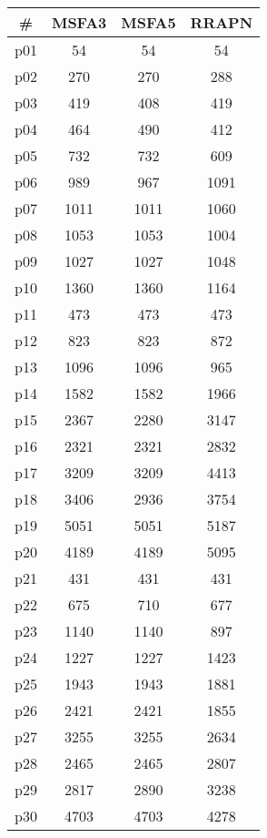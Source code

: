 \begin{tabular}{c||c|c|c}
\textbf{\#} & \textbf{MSFA3} & \textbf{MSFA5} & \textbf{RRAPN}\\
\hline
\hline
p01 & 54 & 54 & 54\\
p02 & 270 & 270 & 288\\
p03 & 419 & 408 & 419\\
p04 & 464 & 490 & 412\\
p05 & 732 & 732 & 609\\
p06 & 989 & 967 & 1091\\
p07 & 1011 & 1011 & 1060\\
p08 & 1053 & 1053 & 1004\\
p09 & 1027 & 1027 & 1048\\
p10 & 1360 & 1360 & 1164\\
p11 & 473 & 473 & 473\\
p12 & 823 & 823 & 872\\
p13 & 1096 & 1096 & 965\\
p14 & 1582 & 1582 & 1966\\
p15 & 2367 & 2280 & 3147\\
p16 & 2321 & 2321 & 2832\\
p17 & 3209 & 3209 & 4413\\
p18 & 3406 & 2936 & 3754\\
p19 & 5051 & 5051 & 5187\\
p20 & 4189 & 4189 & 5095\\
p21 & 431 & 431 & 431\\
p22 & 675 & 710 & 677\\
p23 & 1140 & 1140 & 897\\
p24 & 1227 & 1227 & 1423\\
p25 & 1943 & 1943 & 1881\\
p26 & 2421 & 2421 & 1855\\
p27 & 3255 & 3255 & 2634\\
p28 & 2465 & 2465 & 2807\\
p29 & 2817 & 2890 & 3238\\
p30 & 4703 & 4703 & 4278\\
\end{tabular}

